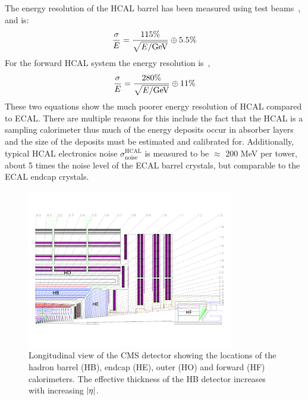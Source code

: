 The energy resolution of the HCAL barrel has been measured using test beams~\cite{Elvira:800406}, and is:
\begin{equation}
\label{eqn:hcal_res}
\frac{\sigma}{E} = \frac{115\%}{\sqrt{E/\mathrm{GeV}}} \oplus 5.5\%
\end{equation}
For the forward HCAL system the energy resolution is~\cite{Baiatian:951395},
\begin{equation}
\label{eqn:hcal_res}
\frac{\sigma}{E} = \frac{280\%}{\sqrt{E/\mathrm{GeV}}} \oplus 11\%
\end{equation}
These two equations show the much poorer energy resolution of HCAL compared to ECAL.
There are multiple reasons for this include the fact that the HCAL is a sampling 
calorimeter thus much of the energy deposits occur in absorber layers and the 
size of the deposits must be estimated and calibrated for.
Additionally, typical HCAL electronics noise $\sigma ^{\text{HCAL}} _{\text{noise}}$ 
is measured to be $\approx$ 200 MeV per tower, about 5 times the noise level of
the ECAL barrel crystals, but comparable to the ECAL endcap crystals.

\begin{figure}[htbp]
\centering
     \includegraphics[width=0.8\textwidth]{cms_and_lhc/plots/cms_hcal.pdf}
     \caption{
Longitudinal view of the CMS detector showing the locations of the hadron 
barrel (HB), endcap (HE), outer (HO) and forward (HF) calorimeters. The
effective thickness of the HB detector increases with increasing $\lvert\eta\rvert$.
     }
     \label{fig:cms_hcal}
\end{figure}




